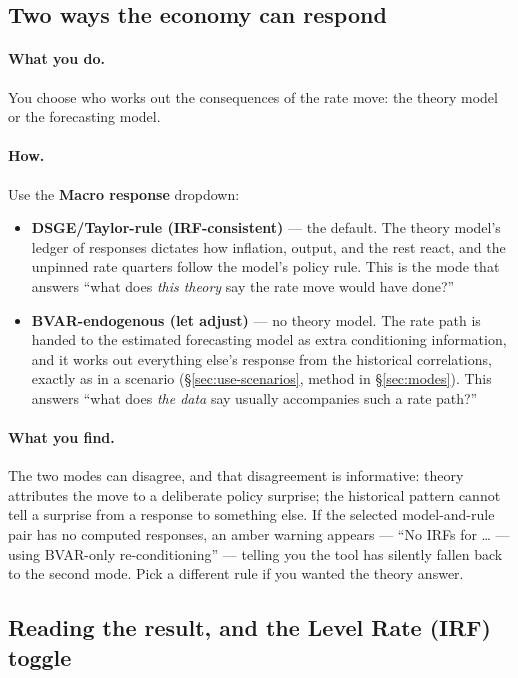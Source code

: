 \documentclass[11pt]{article}
\theoremstyle{definition}
\theoremstyle{remark}
\begin{document}
\subsection{Two ways the economy can respond}

\paragraph{What you do.} You choose who works out the consequences of the rate
move: the theory model or the forecasting model.

\paragraph{How.} Use the \textbf{Macro response} dropdown:
\begin{itemize}
  \item \textbf{DSGE/Taylor-rule (IRF-consistent)} --- the default. The theory
    model's ledger of responses dictates how inflation, output, and the rest
    react, and the unpinned rate quarters follow the model's policy rule. This
    is the mode that answers ``what does \emph{this theory} say the rate move
    would have done?''
  \item \textbf{BVAR-endogenous (let adjust)} --- no theory model. The rate
    path is handed to the estimated forecasting model as extra conditioning
    information, and it works out everything else's response from the
    historical correlations, exactly as in a scenario
    (\S\ref{sec:use-scenarios}, method in \S\ref{sec:modes}). This answers
    ``what does \emph{the data} say usually accompanies such a rate path?''
\end{itemize}

\paragraph{What you find.} The two modes can disagree, and that disagreement
is informative: theory attributes the move to a deliberate policy surprise;
the historical pattern cannot tell a surprise from a response to something
else. If the selected model-and-rule pair has no computed responses, an amber
warning appears --- ``No IRFs for \ldots{} --- using BVAR-only
re-conditioning'' --- telling you the tool has silently fallen back to the
second mode. Pick a different rule if you wanted the theory answer.

\subsection{Reading the result, and the Level \textbar{} Rate (IRF) toggle}
\end{document}
